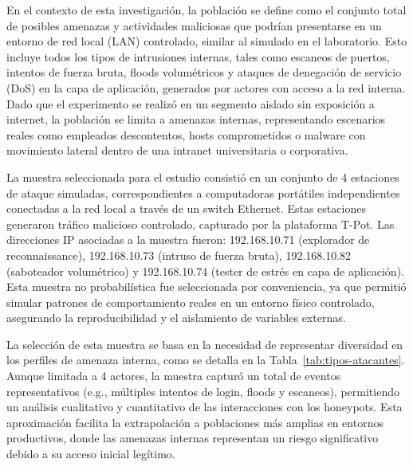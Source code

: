En el contexto de esta investigación, la población se define como el conjunto total de posibles amenazas y actividades maliciosas que podrían presentarse en un entorno de red local (LAN) controlado, similar al simulado en el laboratorio. Esto incluye todos los tipos de intrusiones internas, tales como escaneos de puertos, intentos de fuerza bruta, floods volumétricos y ataques de denegación de servicio (DoS) en la capa de aplicación, generados por actores con acceso a la red interna. Dado que el experimento se realizó en un segmento aislado sin exposición a internet, la población se limita a amenazas internas, representando escenarios reales como empleados descontentos, hosts comprometidos o malware con movimiento lateral dentro de una intranet universitaria o corporativa.

La muestra seleccionada para el estudio consistió en un conjunto de 4 estaciones de ataque simuladas, correspondientes a computadoras portátiles independientes conectadas a la red local a través de un switch Ethernet. Estas estaciones generaron tráfico malicioso controlado, capturado por la plataforma T-Pot. Las direcciones IP asociadas a la muestra fueron: 192.168.10.71 (explorador de reconnaissance), 192.168.10.73 (intruso de fuerza bruta), 192.168.10.82 (saboteador volumétrico) y 192.168.10.74 (tester de estrés en capa de aplicación). Esta muestra no probabilística fue seleccionada por conveniencia, ya que permitió simular patrones de comportamiento reales en un entorno físico controlado, asegurando la reproducibilidad y el aislamiento de variables externas.

La selección de esta muestra se basa en la necesidad de representar diversidad en los perfiles de amenaza interna, como se detalla en la Tabla~\ref{tab:tipos-atacantes}. Aunque limitada a 4 actores, la muestra capturó un total de eventos representativos (e.g., múltiples intentos de login, floods y escaneos), permitiendo un análisis cualitativo y cuantitativo de las interacciones con los honeypots. Esta aproximación facilita la extrapolación a poblaciones más amplias en entornos productivos, donde las amenazas internas representan un riesgo significativo debido a su acceso inicial legítimo.

